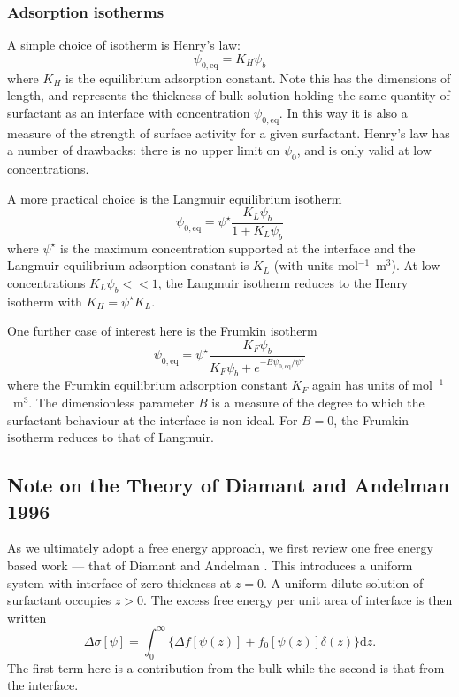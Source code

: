 \subsubsection{Adsorption isotherms}

A simple choice of isotherm is Henry's law:
\begin{equation}
\psi_{0,\mathrm{eq}} = K_H \psi_b
\label{eq:iso:henry}
\end{equation}
where $K_H$ is the equilibrium adsorption constant. Note this has the
dimensions of length, and represents the thickness of bulk solution
holding the same quantity of surfactant as an interface with
concentration $\psi_{0,\mathrm{eq}}$. In this way it is also a
measure of the strength of surface activity for a given surfactant.
Henry's law has a number of drawbacks: there is no upper limit
on $\psi_0$, and is only valid at low concentrations.

A more practical choice is the Langmuir equilibrium isotherm
\begin{equation}
\psi_{0,\mathrm{eq}} = \psi^\star \frac{K_L \psi_b}{1 + K_L \psi_b}
\label{eq:iso:langmuir}
\end{equation}
where $\psi^\star$ is the maximum concentration supported at the
interface and the Langmuir equilibrium adsorption constant is $K_L$
(with units mol$^{-1}$~m$^3$). At low concentrations $ K_L\psi_b << 1$,
the Langmuir isotherm reduces to the Henry isotherm with
$K_H = \psi^\star K_L$.

One further case of interest here is the Frumkin isotherm
\begin{equation}
\psi_{0, \mathrm{eq}} = \psi^\star
\frac{K_F \psi_b}{K_F\psi_b + e^{-B\psi_{0,\mathrm{eq}} / \psi^\star}}
\label{eq:iso:frumkin}
\end{equation}
where the Frumkin equilibrium adsorption constant $K_F$ again
has units of mol$^{-1}$~m$^3$. The dimensionless parameter $B$
 is a measure of the degree to which the surfactant behaviour
at the interface is non-ideal. For $B=0$, the Frumkin isotherm
reduces to that of Langmuir.

\subsection{Note on the Theory of Diamant and Andelman 1996}

As we ultimately adopt a free energy approach, we first review one
free energy based work --- that of Diamant and Andelman
\cite{diamant96}. This introduces a uniform system with interface
of zero thickness at $z = 0$. A uniform dilute solution of
surfactant occupies $z > 0$. The excess free energy per unit area
of interface is then written
\begin{equation}
\Delta\sigma [\psi] = \int_0^\infty  \big\{ \Delta f[\psi (z)] +
f_0 [\psi (z) ] \delta(z)  \big\} \mathrm{d}z. 
\end{equation}
The first term here is a contribution from the bulk while the
second is that from the interface. 

